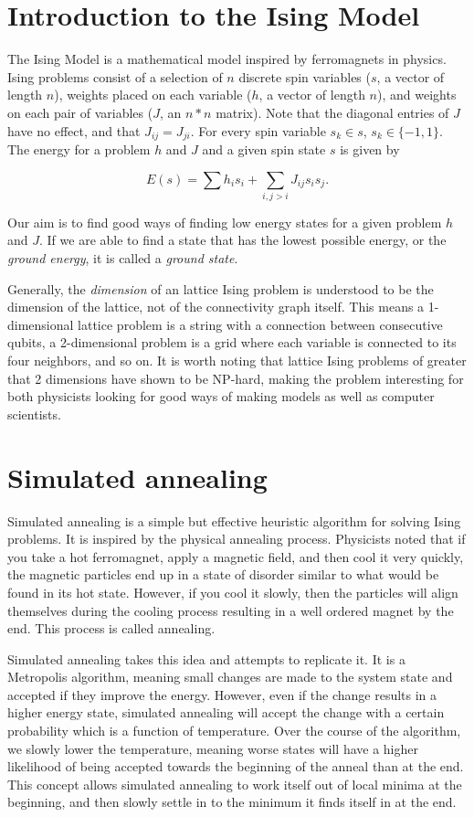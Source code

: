 \documentclass[11pt]{report}
\newcommand{\?}{\stackrel{?}{=}}
\begin{document}
\section{Introduction to the Ising Model}
The Ising Model is a mathematical model inspired by ferromagnets in physics. Ising problems consist of a selection of $n$ discrete spin variables ($s$, a vector of length $n$), weights placed on each variable ($h$, a vector of length $n$), and weights on each pair of variables ($J$, an $n*n$ matrix). Note that the diagonal entries of $J$ have no effect, and that $J_{ij}=J_{ji}$. For every spin variable $s_k \in s$, $s_k \in \{-1,1\}$. The energy for a problem $h$ and $J$ and a given spin state $s$ is given by

$$E(s) = \sum h_is_i + \sum_{i,j>i}J_{ij}s_is_j.$$

Our aim is to find good ways of finding low energy states for a given problem $h$ and $J$. If we are able to find a state that has the lowest possible energy, or the \textit{ground energy}, it is called a \textit{ground state}.

Generally, the \textit{dimension} of an lattice Ising problem is understood to be the dimension of the lattice, not of the connectivity graph itself. This means a 1-dimensional lattice problem is a string with a connection between consecutive qubits, a 2-dimensional problem is a grid where each variable is connected to its four neighbors, and so on. It is worth noting that lattice Ising problems of greater that 2 dimensions have shown to be NP-hard, making the problem interesting for both physicists looking for good ways of making models as well as computer scientists.

\section{Simulated annealing}
Simulated annealing is a simple but effective heuristic algorithm for solving Ising problems. It is inspired by the physical annealing process. Physicists noted that if you take a hot ferromagnet, apply a magnetic field, and then cool it very quickly, the magnetic particles end up in a state of disorder similar to what would be found in its hot state. However, if you cool it slowly, then the particles will align themselves during the cooling process resulting in a well ordered magnet by the end. This process is called annealing.

Simulated annealing takes this idea and attempts to replicate it. It is a Metropolis algorithm, meaning small changes are made to the system state and accepted if they improve the energy. However, even if the change results in a higher energy state, simulated annealing will accept the change with a certain probability which is a function of temperature. Over the course of the algorithm, we slowly lower the temperature, meaning worse states will have a higher likelihood of being accepted towards the beginning of the anneal than at the end. This concept allows simulated annealing to work itself out of local minima at the beginning, and then slowly settle in to the minimum it finds itself in at the end.
\end{document}
